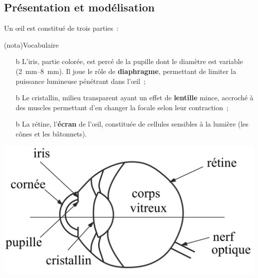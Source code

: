 \documentclass[../../main/main.tex]{subfiles}
\begin{document}
\subsection{Présentation et modélisation}
Un œil est constitué de trois parties~:\smallbreak
\begin{tcbraster}[raster columns=2, raster equal height=rows]
	\begin{tcb*}[label=nota:oeilvoca](nota){Vocabulaire}
		\begin{itemize}
			\item[b]{L'iris,} partie colorée, est percé de la pupille dont le diamètre
			est variable (\SIrange{2}{8}{mm}). Il joue le rôle de
			\textbf{diaphragme}, permettant de limiter la puissance lumineuse
			pénétrant dans l'œil~;
			\item[b]{Le cristallin,} milieu transparent ayant un effet de
			\textbf{lentille} mince, accroché à des muscles permettant d'en changer
			la focale selon leur contraction~;
			\item[b]{La rétine,} l'\textbf{écran} de l'œil, constituée de cellules
			sensibles à la lumière (les cônes et les bâtonnets).
		\end{itemize}
		\begin{center}
			\includegraphics[width=\linewidth]{oeil_coupe}

\end{center}
\end{tcb*}
\end{tcbraster}
\end{document}
